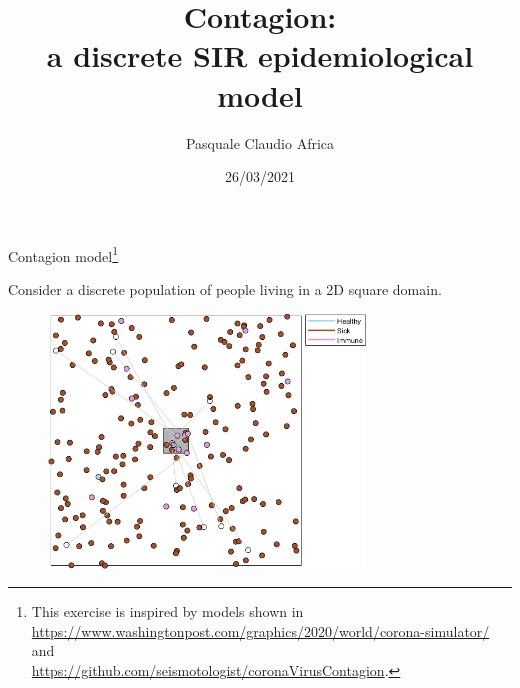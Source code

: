 \documentclass[10pt]{beamer}
\begin{document}
    \title{Contagion:\\a discrete SIR epidemiological model}
    \author{Pasquale Claudio Africa}
    \date{26/03/2021}
    
\begin{frame}
    \maketitle
\end{frame}

\begin{frame}{Contagion model\footnote{This exercise is inspired by models shown in \\
\url{https://www.washingtonpost.com/graphics/2020/world/corona-simulator/} and \\
\url{https://github.com/seismotologist/coronaVirusContagion}.}}

Consider a discrete population of people living in a 2D square domain.

\begin{figure}
    \includegraphics[width=0.75\textwidth]{contagion.png}
\end{figure}
\end{frame}
\end{document}

